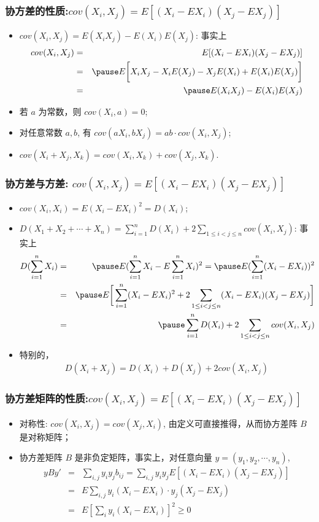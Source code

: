 \begin{frame}
	\frametitle{协方差的性质:$cov (X_i,X_j)=E[(X_i-EX_i)(X_j-EX_j)]$}
	\begin{itemize}[<+-|alert@+>]
		\item $cov (X_i,X_j)=E (X_iX_j)-E (X_i) E (X_j)$: 事实上 \pause
		\begin{eqnarray*}
			cov(X_i,X_j)&=&E[(X_i-EX_i)(X_j-EX_j)]\\
			&=&\pause E\bigg[X_iX_j-X_iE(X_j)-X_jE(X_i)+E(X_i)E(X_j)\bigg]\\
			&=&\pause E(X_iX_j)-E(X_i)E(X_j)
		\end{eqnarray*}
		\item 若 $a$ 为常数，则 $cov (X_i,a)=0$;
		\item 对任意常数 $a,b$, 有 $cov (aX_i,bX_j)=ab\cdot  cov (X_i,X_j)$;
		\item $cov(X_i+X_j, X_k)=cov(X_i,X_k)+cov(X_j,X_k)$.

	\end{itemize}
\end{frame}
\begin{frame}
	\frametitle{协方差与方差: $cov (X_i,X_j)=E[(X_i-EX_i)(X_j-EX_j)]$}
	\begin{itemize}[<+-|alert@+>]
		\item $cov(X_i,X_i)=E(X_i-EX_i)^2=D(X_i)$;
		\item $D (X_1+X_2+\cdots+X_n)=\sum_{i=1}^nD (X_i)+2\sum_{1\le i<j\le n} cov (X_i,X_j)$: 事实上 \pause
		\begin{eqnarray*}
			D(\sum_{i=1}^nX_i)&=&\pause E(\sum_{i=1}^nX_i-E\sum_{i=1}^nX_i)^2=\pause E(\sum_{i=1}^n(X_i-EX_i))^2\\
			&=&\pause E\bigg[\sum_{i=1}^n(X_i-EX_i)^2+2\sum_{1\le i<j\le n}(X_i-EX_i)(X_j-EX_j)\bigg]\\
			&=&\pause \sum_{i=1}^nD(X_i)+2\sum_{1\le i<j\le n}cov(X_i,X_j)
		\end{eqnarray*}
		\item 特别的，
		\begin{eqnarray*}
			D(X_i+X_j)=D(X_i)+D(X_j)+2cov(X_i,X_j)
		\end{eqnarray*}


	\end{itemize}
\end{frame}
\begin{frame}
	\frametitle{协方差矩阵的性质:$cov (X_i,X_j)=E[(X_i-EX_i)(X_j-EX_j)]$}
	\begin{itemize}
		\item 对称性: $cov (X_i,X_j)=cov (X_j,X_i)$, 由定义可直接推得，从而协方差阵 $B$ 是对称矩阵；
		\item 协方差矩阵 $B$ 是非负定矩阵，事实上，对任意向量 $y=(y_1,y_2,\cdots,y_n)$,
		\begin{eqnarray*}
			yBy'&=&\sum_{i,j}y_iy_jb_{ij}=\sum_{i,j}y_iy_jE[(X_i-EX_i)(X_j-EX_j)]\\
			&=&E\sum_{i,j}y_i(X_i-EX_i)\cdot y_j(X_j-EX_j)\\
			&=&E[\sum_{i}y_i(X_i-EX_i)]^2\ge 0
		\end{eqnarray*}

	\end{itemize}
\end{frame}
